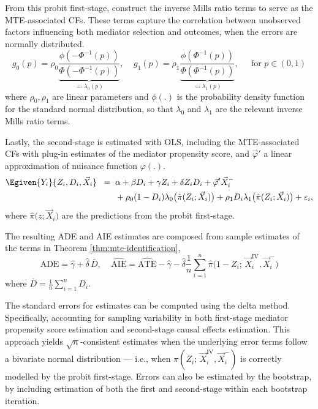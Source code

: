 From this probit first-stage, construct the inverse Mills ratio terms to serve as the MTE-associated CFs.
These terms capture the correlation between unobserved factors influencing both mediator selection and outcomes, when the errors are normally distributed.
\[ g_0(p) = \rho_0
        \underbrace{\frac{\phi( - \Phi^{-1}(p) )}{\Phi( -\Phi^{-1}(p) )}}_{
            \eqqcolon \lambda_0(p)
        }, \;\;\;\;
    g_1(p) = \rho_1
        \underbrace{\frac{\phi( \Phi^{-1}(p) )}{\Phi( \Phi^{-1}(p) )}}_{
            \eqqcolon \lambda_1(p)
        },
        \;\;\;\; \text{ for } p \in (0,1) \]
where $\rho_0, \rho_1$ are linear parameters and $\phi(.)$ is the probability density function for the standard normal distribution, so that $\lambda_0$ and $\lambda_1$ are the relevant inverse Mills ratio terms.

Lastly, the second-stage is estimated with OLS, including the MTE-associated CFs with plug-in estimates of the mediator propensity score, and $\vec \varphi'$ a linear approximation of nuisance function $\varphi(.)$.
\begin{align*}
    \Egiven{Y_i}{Z_i, D_i, \vec X_i} \;\; =& \;\;
        \alpha
        + \beta D_i
        + \gamma Z_i
        + \delta Z_i D_i
        + \vec \varphi' \vec X_i^- \\
        & \;\; + \rho_0 (1 - D_i) \lambda_0 \big( \hat \pi(Z_i; \vec X_i) \big)
    + \rho_1 D_i \lambda_1\big( \hat \pi(Z_i; \vec X_i) \big)
    + \varepsilon_i,
\end{align*}
where $\hat\pi \big(z;\vec X_i \big)$ are the predictions from the probit first-stage.

The resulting ADE and AIE estimates are composed from sample estimates of the terms in Theorem \ref{thm:mte-identification},
\[ \hat{\text{ADE}}
    = \hat{\gamma} + \hat{\delta}\,\bar D, \;\;\;\;
    \hat{\text{AIE}}
    = \hat{\text{ATE}}
        - \hat \gamma
        - \hat \delta \frac1n \sum_{i=1}^n
            \hat \pi\big(1-Z_i; \,\vec X_i ^{\mathrm{IV}}, \vec X_i^- \big)
    \]
where $\bar D = \frac1n \sum_{i=1}^n D_i$.

The standard errors for estimates can be computed using the delta method.
Specifically, accounting for sampling variability in both first-stage mediator propensity score estimation and second-stage causal effects estimation.
This approach yields $\sqrt{n}$-consistent estimates when the underlying error terms follow a bivariate normal distribution --- i.e., when $\pi(Z_i; \,\vec X_i ^{\mathrm{IV}}, \vec X_i^-)$ is correctly modelled by the probit first-stage.
Errors can also be estimated by the bootstrap, by including estimation of both the first and second-stage within each bootstrap iteration.

